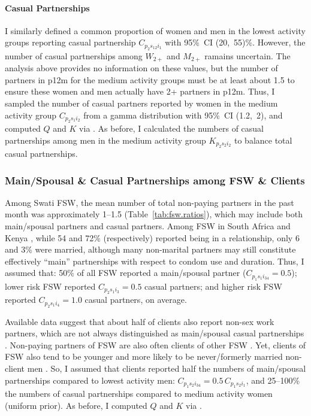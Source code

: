 \paragraph{Casual Partnerships}
I similarly defined a common proportion of women and men in the lowest activity groups
reporting casual partnership $C_{p_{2}s_{12}i_{1}}$ with 95\%~CI (20,~55)\%.
However, the number of casual partnerships among $W_{2+}$ and $M_{2+}$ ramains uncertain.
The analysis above provides no information on these values,
but the number of partners in p12m for the medium activity groups must be at least about 1.5
to ensure these women and men actually have 2+ partners in p12m.
Thus, I sampled the number of casual partners reported by women in the medium activity group
$C_{p_{2}s_{1}i_{2}}$ from a gamma distribution with 95\%~CI (1.2,~2),
and computed $Q$ and $K$ via .
As before, I calculated the numbers of casual partnerships among men in the medium activity group
$K_{p_{2}s_{2}i_{2}}$ to balance total casual partnerships.
\subsubsection{Main/Spousal \& Casual Partnerships among FSW \& Clients}\label{model.par.nsw.sw}
Among Swati FSW, the mean number of total non-paying partners in the past month was
approximately 1--1.5 (Table~\ref{tab:fsw.ratios}),
which may include both main/spousal partners and casual partners.
Among FSW in South Africa \cite{Wells2018} and Kenya \cite{Voeten2007},
while 54 and 72\% (respectively) reported being in a relationship, only 6 and 3\% were married,
although many non-marital partners may still constitute effectively ``main'' partnerships
with respect to condom use and duration.
Thus, I assumed that:
50\% of all FSW reported a main/spousal partner (\ie $C_{p_{1}s_{1}i_{34}} = 0.5$);
lower risk FSW reported $C_{p_{2}s_{1}i_{3}} = 0.5$ casual partners; and
higher risk FSW reported $C_{p_{2}s_{1}i_{4}} = 1.0$ casual partners, on average.
\par
Available data suggest that about half of clients also report non-sex work partners,
which are not always distinguished as main/spousal \vs casual partnerships
\cite{Lowndes2000,Santo2005}.
Non-paying partners of FSW are also often clients of other FSW \cite{Voeten2007,Godin2008}.
Yet, clients of FSW also tend to be younger and more likely to be
never/formerly married \vs non-client men \cite{Lowndes2000,Carael2006}.
So, I assumed that clients reported
half the numbers of main/spousal partnerships compared to lowest activity men:
$C_{p_{1}s_{2}i_{34}} = 0.5\,C_{p_{1}s_{2}i_{1}}$, and
25--100\% the numbers of casual partnerships compared to medium activity women (uniform prior).
As before, I computed $Q$ and $K$ via .
